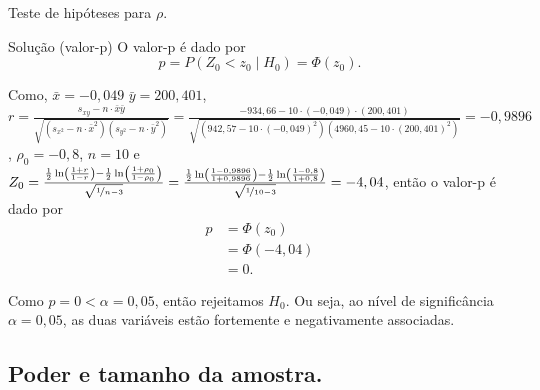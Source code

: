 \documentclass[9pt]{beamer}
\begin{document}
\begin{frame}{Teste de hipóteses para $\rho$.}

\begin{block}{Solução (valor-p)}
	O valor-p é dado por
	$$p = P\left( Z_0 < z_0 \mid H_0 \right) = \Phi(z_0).$$
	
	Como, $\bar{x} = -0,049$ $\bar{y} = 200,401$, $r = \frac{s_{xy} - n \cdot \bar{x}\bar{y}}{\sqrt{ (s_{x^2} - n \cdot \bar{x}^2) (s_{y^2} - n \cdot \bar{y}^2) }} =\allowbreak \frac{-934,66 - 10 \cdot (-0,049) \cdot (200,401) }{\sqrt{ (942,57 - 10 \cdot (-0,049)^2) (4960,45 - 10 \cdot (200,401)^2) }} = -0,9896$, $\rho_0 = -0,8$, $n = 10$ e $Z_0 =  \frac{\frac{1}{2} \ln\left( \frac{1+r}{1-r} \right) - \frac{1}{2} \ln\left( \frac{1 + \rho_0}{1 - \rho_0} \right) }{\sqrt{\nicefrac{1}{n - 3}}}=\allowbreak \frac{\frac{1}{2} \ln\left( \frac{1 - 0,9896}{1 + 0,9896} \right) - \frac{1}{2} \ln\left( \frac{1 - 0,8}{1 + 0,8} \right) }{\sqrt{\nicefrac{1}{10 - 3}}}= -4,04$, então o valor-p é dado por
	\begin{align*}
		p &= \Phi(z_0)\\
		&= \Phi(-4,04)\\
		&= 0.
	\end{align*}
	
	Como $p = 0 < \alpha=0,05$, então rejeitamos $H_0$. Ou seja, ao nível de significância $\alpha=0,05$, as duas variáveis estão fortemente e negativamente associadas.
\end{block}

\end{frame}

\subsection{Poder e tamanho da amostra.}
\end{document}
